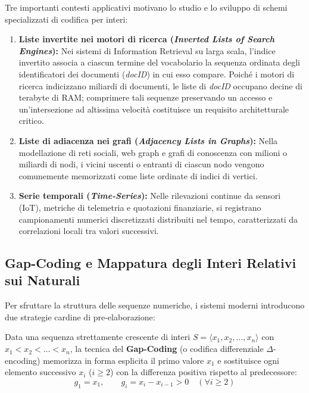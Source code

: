 Tre importanti contesti applicativi motivano lo studio e lo sviluppo di schemi specializzati di codifica per interi:
\begin{enumerate}
  \item \textbf{Liste invertite nei motori di ricerca (\textit{Inverted Lists of Search Engines}):} Nei sistemi di Information Retrieval su larga scala, l'indice invertito associa a ciascun termine del vocabolario la sequenza ordinata degli identificatori dei documenti (\textit{docID}) in cui esso compare. Poich\'e i motori di ricerca indicizzano miliardi di documenti, le liste di \textit{docID} occupano decine di terabyte di RAM; comprimere tali sequenze preservando un accesso e un'intersezione ad altissima velocit\`a costituisce un requisito architetturale critico.
  \item \textbf{Liste di adiacenza nei grafi (\textit{Adjacency Lists in Graphs}):} Nella modellazione di reti sociali, web graph e grafi di conoscenza con milioni o miliardi di nodi, i vicini uscenti o entranti di ciascun nodo vengono comunemente memorizzati come liste ordinate di indici di vertici.
  \item \textbf{Serie temporali (\textit{Time-Series}):} Nelle rilevazioni continue da sensori (IoT), metriche di telemetria e quotazioni finanziarie, si registrano campionamenti numerici discretizzati distribuiti nel tempo, caratterizzati da correlazioni locali tra valori successivi.
\end{enumerate}

\FloatBarrier
\subsection{Gap-Coding e Mappatura degli Interi Relativi sui Naturali}
\label{subsec:gap-coding-zigzag}

Per sfruttare la struttura delle sequenze numeriche, i sistemi moderni introducono due strategie cardine di pre-elaborazione:

\begin{definition}
Data una sequenza strettamente crescente di interi $S = \langle x_1, x_2, \dots, x_n \rangle$ con $x_1 < x_2 < \dots < x_n$, la tecnica del \textbf{Gap-Coding} (o codifica differenziale $\Delta$-encoding) memorizza in forma esplicita il primo valore $x_1$ e sostituisce ogni elemento successivo $x_i$ ($i \ge 2$) con la differenza positiva rispetto al predecessore:
\begin{equation}
  g_1 = x_1, \qquad g_i = x_i - x_{i-1} > 0 \quad (\forall i \ge 2)
\end{equation}
\end{definition}

